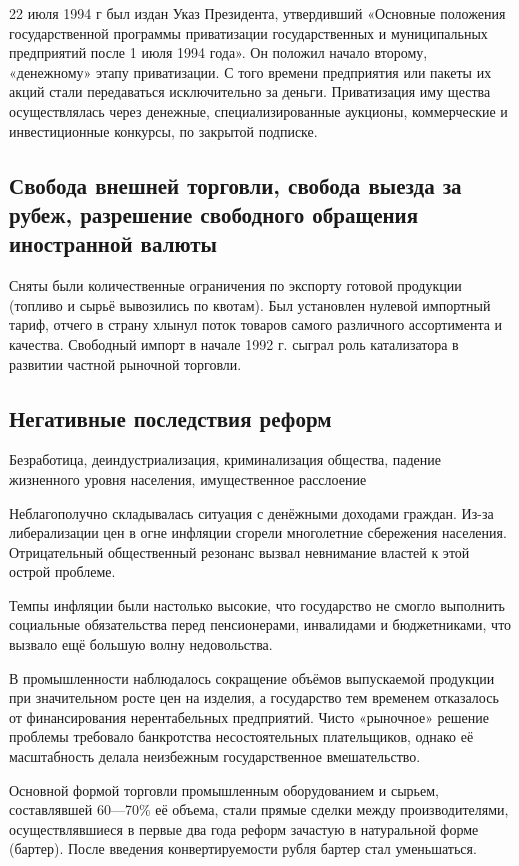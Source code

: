 22 июля 1994 г был издан Указ Президента, утвердивший «Основные положения государственной программы приватизации государственных и муниципальных предприятий после 1 июля 1994 года». Он положил начало второму, «денежному» этапу приватизации. С того времени предприятия или пакеты их акций стали передаваться исключительно за деньги. Приватизация иму щества осуществлялась через денежные, специализированные аукционы, коммерческие и инвестиционные конкурсы, по закрытой подписке.
\subsection{Свобода внешней торговли, свобода выезда за рубеж, разрешение свободного обращения иностранной валюты}
Сняты были количественные ограничения по экспорту готовой продукции (топливо и сырьё вывозились по квотам). Был установлен нулевой импортный тариф, отчего в страну хлынул поток товаров самого различного ассортимента и качества. Свободный импорт в начале 1992 г. сыграл роль катализатора в развитии частной рыночной торговли. 
\subsection{Негативные последствия реформ}
Безработица, деиндустриализация, криминализация общества, падение жизненного уровня населения, имущественное расслоение

Неблагополучно складывалась ситуация с денёжными доходами граждан. Из-за либерализации цен в огне инфляции сгорели многолетние сбережения населения. Отрицательный общественный резонанс вызвал невнимание властей к этой острой проблеме.

Темпы инфляции были настолько высокие, что государство не смогло выполнить социальные обязательства перед пенсионерами, инвалидами и бюджетниками, что вызвало ещё большую волну недовольства.

В промышленности наблюдалось сокращение объёмов выпускаемой продукции при значительном росте цен на изделия, а государство тем временем отказалось от финансирования нерентабельных предприятий. Чисто «рыночное» решение проблемы требовало банкротства несостоятельных плательщиков, однако её масштабность делала неизбежным государственное вмешательство.

Основной формой торговли промышленным оборудованием и сырьем, составлявшей 60—70\% её объема, стали прямые сделки между производителями, осуществлявшиеся в первые два года реформ зачастую в натуральной форме (бартер). После введения конвертируемости рубля бартер стал уменьшаться.

